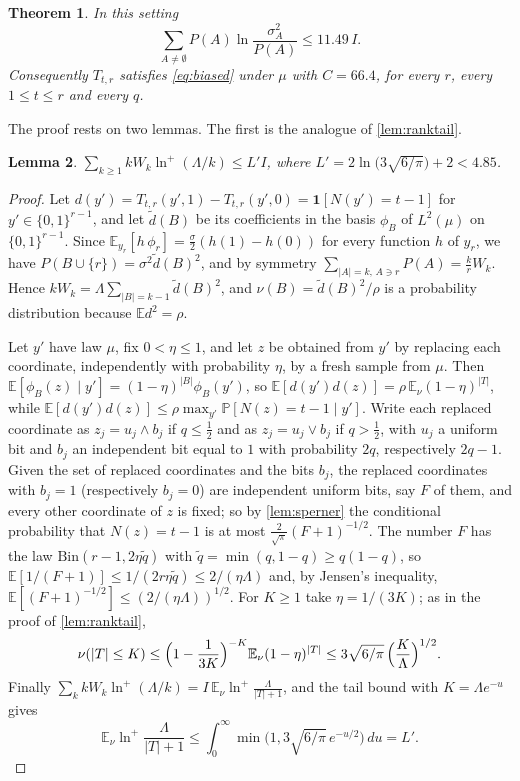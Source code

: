\documentclass[11pt]{amsart}
\newtheorem{theorem}{Theorem}[section]
\newtheorem{lemma}[theorem]{Lemma}
\theoremstyle{definition}
\theoremstyle{remark}
\newcommand{\E}{\mathbb{E}}
\renewcommand{\Pr}{\mathbb{P}}
\newcommand{\Bin}{\mathrm{Bin}}
\newcommand{\bits}{\{0,1\}}
\begin{document}
\begin{theorem}\label{thm:threshold}
In this setting
\[
\sum_{A\ne\emptyset}P(A)\ln\frac{\sigma_A^2}{P(A)}\le 11.49\,I .
\]
Consequently $T_{t,r}$ satisfies \eqref{eq:biased} under $\mu$ with $C=66.4$, for every $r$, every $1\le t\le r$ and
every $q$.
\end{theorem}

The proof rests on two lemmas. The first is the analogue of \cref{lem:ranktail}.

\begin{lemma}\label{lem:thr-rank}
$\sum_{k\ge1}kW_k\ln^+(\Lambda/k)\le L'I$, where $L'=2\ln\bigl(3\sqrt{6/\pi}\bigr)+2<4.85$.
\end{lemma}

\begin{proof}
Let $d(y')=T_{t,r}(y',1)-T_{t,r}(y',0)=\mathbf 1[N(y')=t-1]$ for $y'\in\bits^{r-1}$, and let $\widetilde d(B)$ be
its coefficients in the basis $\phi_B$ of $L^2(\mu)$ on $\bits^{r-1}$. Since $\E_{y_r}[h\,\phi_r]=\frac\sigma2
(h(1)-h(0))$ for every function $h$ of $y_r$, we have $P(B\cup\{r\})=\sigma^2\widetilde d(B)^2$, and by symmetry
$\sum_{|A|=k,\,A\ni r}P(A)=\frac krW_k$. Hence $kW_k=\Lambda\sum_{|B|=k-1}\widetilde d(B)^2$, and
$\nu(B)=\widetilde d(B)^2/\rho$ is a probability distribution because $\E d^2=\rho$.

Let $y'$ have law $\mu$, fix $0<\eta\le1$, and let $z$ be obtained from $y'$ by replacing each coordinate,
independently with probability $\eta$, by a fresh sample from $\mu$. Then $\E[\phi_B(z)\mid y']=(1-\eta)^{|B|}
\phi_B(y')$, so $\E[d(y')d(z)]=\rho\,\E_\nu(1-\eta)^{|T|}$, while $\E[d(y')d(z)]\le\rho\max_{y'}\Pr[N(z)=t-1\mid y']$.
Write each replaced coordinate as $z_j=u_j\wedge b_j$ if $q\le\frac12$ and as $z_j=u_j\vee b_j$ if $q>\frac12$, with
$u_j$ a uniform bit and $b_j$ an independent bit equal to $1$ with probability $2q$, respectively $2q-1$. Given the
set of replaced coordinates and the bits $b_j$, the replaced coordinates with $b_j=1$ (respectively $b_j=0$) are
independent uniform bits, say $F$ of them, and every other coordinate of $z$ is fixed; so by \cref{lem:sperner}
the conditional probability that $N(z)=t-1$ is at most $\frac2{\sqrt\pi}(F+1)^{-1/2}$. The number $F$ has the law
$\Bin(r-1,2\eta\tilde q)$ with $\tilde q=\min(q,1-q)\ge q(1-q)$, so $\E[1/(F+1)]\le1/(2r\eta\tilde q)\le2/(\eta\Lambda)$
and, by Jensen's inequality, $\E[(F+1)^{-1/2}]\le(2/(\eta\Lambda))^{1/2}$. For $K\ge1$ take $\eta=1/(3K)$; as in the
proof of \cref{lem:ranktail},
\[
\nu(|T|\le K)\le\Bigl(1-\frac1{3K}\Bigr)^{-K}\E_\nu(1-\eta)^{|T|}\le3\sqrt{6/\pi}\,\Bigl(\frac K\Lambda\Bigr)^{1/2}.
\]
Finally $\sum_kkW_k\ln^+(\Lambda/k)=I\,\E_\nu\ln^+\frac\Lambda{|T|+1}$, and the tail bound with $K=\Lambda e^{-u}$ gives
\[
\E_\nu\ln^+\frac\Lambda{|T|+1}\le\int_0^\infty\min\bigl(1,3\sqrt{6/\pi}\,e^{-u/2}\bigr)\,du=L'.
\]
\end{proof}
\end{document}
